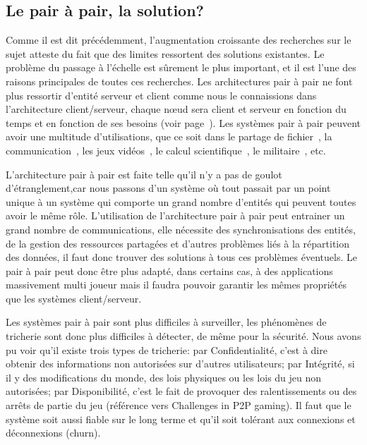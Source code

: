 	\subsection{Le pair à pair, la solution?}
	\par	%
	Comme il est dit précédemment, l'augmentation croissante des recherches sur le sujet atteste du fait que des limites ressortent des solutions existantes. Le problème du passage à l'échelle est sûrement le plus important, et il est l'une des raisons principales de toutes ces recherches. Les architectures pair à pair ne font plus ressortir d'entité serveur et client comme nous le connaissions dans l'architecture client/serveur, chaque nœud sera client et serveur en fonction du temps et en fonction de ses besoins (voir page~\pageref{P2P/ClServ}). Les systèmes pair à pair peuvent avoir une multitude d'utilisations, que ce soit dans le partage de fichier~\cite{gnutella,napster,kazaa}, la communication~\cite{skype}, les jeux vidéos~\cite{starwars}, le calcul scientifique~\cite{Pastry,xtremweb,chord}, le militaire~\cite{jxta}, etc. \\
	\par L'architecture pair à pair est faite telle qu'il n'y a pas de goulot d'étranglement,car nous passons d'un système où tout passait par un point unique à un système qui comporte un grand nombre d'entités qui peuvent toutes avoir le même rôle. L'utilisation de l'architecture pair à pair peut entrainer un grand nombre de communications, elle nécessite des synchronisations des entités, de la gestion des ressources partagées et d'autres problèmes liés à la répartition des données, il faut donc trouver des solutions à tous ces problèmes éventuels. Le pair à pair peut donc être plus adapté, dans certains cas, à des applications massivement multi joueur mais il faudra pouvoir garantir les mêmes propriétés que les systèmes client/serveur. \\
	\par Les systèmes pair à pair sont plus difficiles à surveiller, les phénomènes de tricherie sont donc plus difficiles à détecter, de même pour la sécurité. Nous avons pu voir qu'il existe trois types de tricherie: par Confidentialité, c'est à dire obtenir des informations non autorisées sur d'autres utilisateurs; par Intégrité, si il y des modifications du monde, des lois physiques ou les lois du jeu non autorisées; par Disponibilité, c'est le fait de provoquer des ralentissements ou des arrêts de partie du jeu (référence vers Challenges in P2P gaming). Il faut que le système soit aussi fiable sur le long terme et qu'il soit tolérant aux connexions et déconnexions (churn).\\

